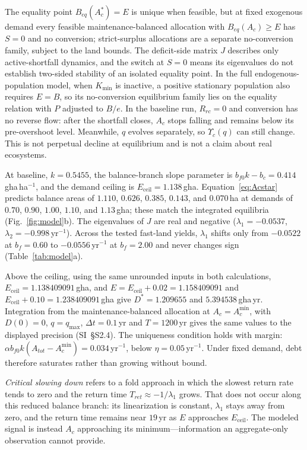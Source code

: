 \documentclass[preprint,12pt,authoryear]{elsarticle}
\newcommand{\Ups}{\Upsilon_c}
\newcommand{\Eceil}{E_{\mathrm{ceil}}}
\newcommand{\Acmin}{A_c^{\min}}
\begin{document}
The equality point $B_{eq}(A_c^*)=E$ is unique when feasible, but at fixed exogenous demand every feasible maintenance-balanced allocation with $B_{eq}(A_c)\ge E$ has $S=0$ and no conversion; strict-surplus allocations are a separate no-conversion family, subject to the land bounds. The deficit-side matrix $J$ describes only active-shortfall dynamics, and the switch at $S=0$ means its eigenvalues do not establish two-sided stability of an isolated equality point. In the full endogenous-population model, when $K_{\min}$ is inactive, a positive stationary population also requires $E=B$, so its no-conversion equilibrium family lies on the equality relation with $P$ adjusted to $B/e$. In the baseline run, $R_{rc}=0$ and conversion has no reverse flow: after the shortfall closes, $A_c$ stops falling and remains below its pre-overshoot level. Meanwhile, $q$ evolves separately, so $\Ups(q)$ can still change. This is not perpetual decline at equilibrium and is not a claim about real ecosystems.

At baseline, $k=0.5455$, the balance-branch slope parameter is $b_{f0}k-b_c=0.414$\,gha\,ha$^{-1}$, and the demand ceiling is $\Eceil=1.138$\,gha. Equation~\eqref{eq:Acstar} predicts balance areas of $1.110$, $0.626$, $0.385$, $0.143$, and $0.070$\,ha at demands of $0.70$, $0.90$, $1.00$, $1.10$, and $1.13$\,gha; these match the integrated equilibria (Fig.~\ref{fig:model}b). The eigenvalues of $J$ are real and negative ($\lambda_1=-0.0537$, $\lambda_2=-0.998$\,yr$^{-1}$). Across the tested fast-land yields, $\lambda_1$ shifts only from $-0.0522$ at $b_f=0.60$ to $-0.0556$\,yr$^{-1}$ at $b_f=2.00$ and never changes sign (Table~\ref{tab:model}a).

Above the ceiling, using the same unrounded inputs in both calculations, $E_{\mathrm{ceil}}=1.138409091$\,gha, and $E=E_{\mathrm{ceil}}+0.02=1.158409091$ and $E_{\mathrm{ceil}}+0.10=1.238409091$\,gha give $D^*=1.209655$ and $5.394538$\,gha\,yr. Integration from the maintenance-balanced allocation at $A_c=\Acmin$, with $D(0)=0$, $q=q_{\max}$, $\Delta t=0.1$\,yr and $T=1200$\,yr gives the same values to the displayed precision (SI~\S S2.4). The uniqueness condition holds with margin: $\alpha b_{f0}k(A_{tot}-\Acmin)=0.034$\,yr$^{-1}$, below $\eta=0.05$\,yr$^{-1}$. Under fixed demand, debt therefore saturates rather than growing without bound.

\emph{Critical slowing down} refers to a fold approach in which the slowest return rate tends to zero and the return time $T_{ret}\approx-1/\lambda_1$ grows. That does not occur along this reduced balance branch: its linearization is constant, $\lambda_1$ stays away from zero, and the return time remains near $19$\,yr as $E$ approaches $\Eceil$. The modeled signal is instead $A_c$ approaching its minimum—information an aggregate-only observation cannot provide.
\end{document}
